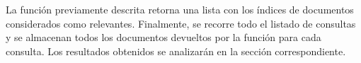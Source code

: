 La función previamente descrita retorna una lista con los índices de documentos considerados como relevantes. Finalmente, se recorre todo el listado de consultas y se almacenan todos los documentos devueltos por la función para cada consulta. Los resultados obtenidos se analizarán en la sección correspondiente.
